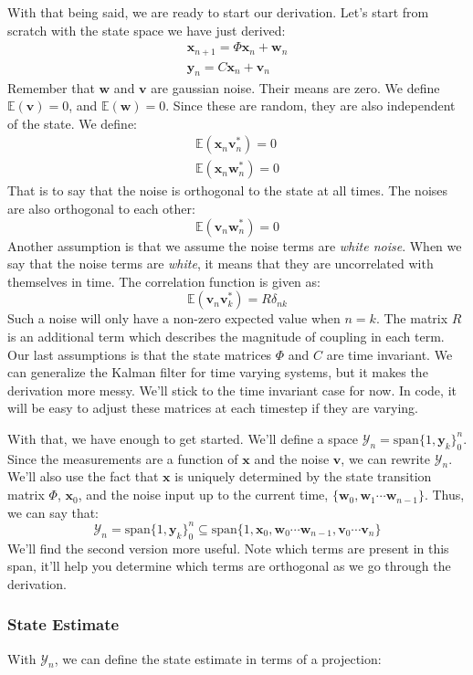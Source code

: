 With that being said, we are ready to start our derivation. Let's start from scratch with the state space we have just derived:
\begin{gather}
\bm{{x}}_{n+1}=\Phi\bm{x}_n+\bm{w}_n\\
\bm{y}_n=C\bm{x}_n+\bm{v}_n
\end{gather}
Remember that $\bm{w}$ and $\bm{v}$ are gaussian noise. Their means are zero. We define $\mathbb{E}(\bm{v})=0$, and $\mathbb{E}(\bm{w})=0$. Since these are random, they are also independent of the state. We define:
\begin{gather}
\mathbb{E}(\bm{x}_n\bm{v}_n^*)=0\\
\mathbb{E}(\bm{x}_n\bm{w}_n^*)=0
\end{gather}
That is to say that the noise is orthogonal to the state at all times. The noises are also orthogonal to each other:
$$\mathbb{E}(\bm{v}_n\bm{w}_n^*)=0$$
Another assumption is that we assume the noise terms are \textit{white noise}. When we say that the noise terms are \textit{white}, it means that they are uncorrelated with themselves in time. The correlation function is given as:
$$\mathbb{E}(\bm{v}_n\bm{v}_k^*)=R\delta_{nk}$$
Such a noise will only have a non-zero expected value when $n=k$. The matrix $R$ is an additional term which describes the magnitude of coupling in each term. Our last assumptions is that the state matrices $\Phi$ and $C$ are time invariant. We can generalize the Kalman filter for time varying systems, but it makes the derivation more messy. We'll stick to the time invariant case for now. In code, it will be easy to adjust these matrices at each timestep if they are varying.

With that, we have enough to get started. We'll define a space $\mathcal{Y}_n=\text{span}\{1,\bm{y}_k\}_0^n$. Since the measurements are a function of $\bm{x}$ and the noise $\bm{v}$, we can rewrite $\mathcal{Y}_n$. We'll also use the fact that $\bm{x}$ is uniquely determined by the state transition matrix $\Phi$, $\bm{x}_0$, and the noise input up to the current time, $\{\bm{w}_0,\bm{w}_1\cdots\bm{w}_{n-1}\}$. Thus, we can say that:
$$\mathcal{Y}_n=\text{span}\{1,\bm{y}_k\}_0^n\subseteq \text{span}\{1,\bm{x}_0,\bm{w}_0\cdots\bm{w}_{n-1},\bm{v}_0\cdots\bm{v}_{n} \}$$
We'll find the second version more useful. Note which terms are present in this span, it'll help you determine which terms are orthogonal as we go through the derivation.

\subsubsection{State Estimate}
With $\mathcal{Y}_n$, we can define the state estimate in terms of a projection:


